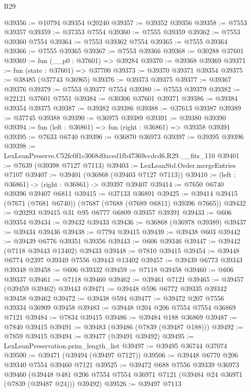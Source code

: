 \begin{lexlean}{R29}
\begin{coremodule}
@39356 := @10794 @39354 @20240
@39357 := @39352 @39356
@39358 := @7553 @39357
@39359 := @37353 @7554
@39360 := @7555 @39359
@39362 := @7553 @39360 @7554
@39364 := @7553 @39362 @7554
@39365 := @7555 @39364
@39366 := @7555 @39365
@39367 := @7553 @39366
@39368 := @30288 @37601
@39369 := fun (__p0 : @37601) => @39284
@39370 := @39368 @39369
@39371 := fun (state : @37601) => @37700
@39373 := @39370 @39371 @39354
@39375 := @38485 (@37743 @36965)
@39376 := @39373 @39375
@39377 := @39367 @39376
@39379 := @7553 @39377 @7554
@39380 := @7553 @39379
@39382 := @22121 @37601 @7551
@39384 := @30306 @37601 @39371
@39386 := @39384 @39354 @39375
@39387 := @39382 @39386
@39388 := @37613 @39387
@39389 := @37745 @39388
@39390 := @36975 @39389
@39391 := @39380 @39390
@39394 := fun (left : @36861) => fun (right : @36861) => @39358 @39391
@39395 := @7633 @6740
@39396 := @36870 @36973
@39397 := @39395 @39396
@39398 := LexLeanPreserve.C52fc0f1c3068d0aced1fb47369ccdcd6.R29.__fits_110
@39401 := @7639 (@39398 @7127 @7113)
@39403 := LexLeanStd.Order.mergeEntries @7107
@39407 := @39401 (@36868 (@39403 @7127 @7113))
@39410 := (left : @36861) -> (right : @36861) -> @39397 @39407
@39414 := @7650 @6740 @39396 @39407 @6811
@39415 := @37133 @36891
@39425 := @39414 @39415 (@7671 (@7681 @6740)) (@7687 (@7688 (@7689 @6811) @39396 @7665))
@39432 := @20293 @39415 @31 @95 @6777 @6809 @39357 @39391
@39433 := @606 @39354
@39434 := @39432 @39433
@39436 := @36868 (@36978 @39389)
@39437 := @39434 @39436
@39438 := @7794 @39415
@39439 := @39438 @603
@39442 := @39439 @6776 @39351 @39356
@39443 := @606 @39346
@39447 := @39442 (@7118 @39443 @13402) @39433
@39448 := @7810 @39415
@39454 := @39448 @6774 @2397 @39349 @7556 @39443 @13402
@39457 := @39439 @6773 @39343 @39348
@39458 := @606 @39332
@39459 := @7118 @39458
@39460 := @606 @39337
@39461 := @7118 @39460
@39462 := @39461 @7121
@39465 := @39457 (@39459 @39462) @39443
@39471 := @39448 @596 @6772 @39335 @39342 @39458 @39462
@39472 := @39438 @594
@39477 := @39472 @207 @7556 @39334 @36909 @39458
@39483 := @39448 @204 @206 @7554 @7554 @36869 @7121
@39484 := @7834 @39415
@39486 := @39484 @188 @36869
@39487 := @7840 @39415
@39491 := @39483 (@39486 (@7839 (@39487 @188)))
@39492 := @7859 @39415
@39494 := @39477 (@39491 @39492)
@39495 := LexLeanPreservation.prim_length_list
@39497 := @39495 @36744 @37074
@39500 := @39471 (@39494 (@39497 @7127))
@39506 := @39448 @6770 @206 @39340 @7554 @39460 @7121
@39525 := @39472
    @688
    @7556
    @39339
    @36973
    @39460
    (@39448 @481 @206 @7554 @7554 @36971 @7121 (@39484 @24 @36971 (@7839 (@39487 @24))) @39492)
@39526 := @39497 @7113

\end{coremodule}
\end{lexlean}
